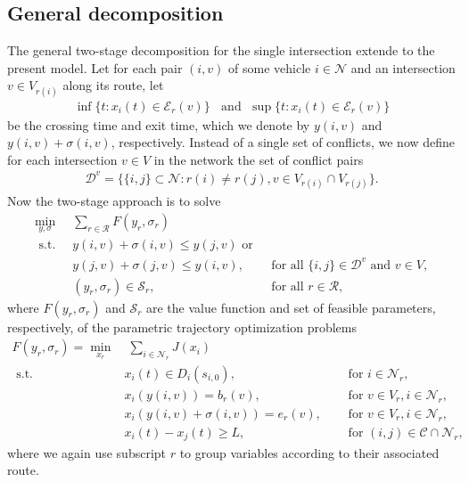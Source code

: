 \documentclass[a4paper]{article}
\theoremstyle{definition}
\theoremstyle{plain}
\begin{document}
\subsection{General decomposition}
The general two-stage decomposition for the single intersection extende to the
present model. Let for each pair $(i,v)$ of some vehicle $i \in \mathcal{N}$ and
an intersection $v \in V_{r(i)}$ along its route, let
\begin{align*}
\inf \{ t: x_{i}(t) \in \mathcal{E}_{r}(v) \} \;\; \text{ and } \; \sup \{ t: x_{i}(t) \in \mathcal{E}_{r}(v) \}
\end{align*}
be the crossing time and exit time, which we denote by $y(i,v)$ and
$y(i,v) + \sigma(i, v)$, respectively.
%
Instead of a single set of conflicts, we now define for each intersection
$v \in V$ in the network the set of conflict pairs
\begin{align*}
\mathcal{D}^{v} = \{ \{i,j\} \subset \mathcal{N} : r(i) \neq r(j), v \in V_{r(i)} \cap V_{r(j)} \} .
\end{align*}
Now the two-stage approach is to solve
\begin{align*}
  \min_{y,\sigma} \;\; & \sum_{r \in \mathcal{R}} F(y_{r}, \sigma_{r}) \\
  \text{ s.t. } & y(i,v) + \sigma(i,v) \leq y(j,v) \text{ or }  \\
                & y(j,v) + \sigma(j,v) \leq y(i,v) , & \text{ for all } \{i,j\} \in \mathcal{D}^{v} \text{ and } v \in V, \\
  & (y_{r}, \sigma_{r}) \in \mathcal{S}_{r} , \quad & \text{ for all } r \in \mathcal{R} ,
\end{align*}
%
where $F(y_{r}, \sigma_{r})$ and $\mathcal{S}_{r}$ are the value function and
set of feasible parameters, respectively, of the parametric trajectory
optimization problems
%
\begin{align*}
  F(y_{r}, \sigma_{r}) = \min_{x_{r}} & \; \sum_{i \in \mathcal{N}_{r}} J(x_{i}) \\
  \text{ s.t. } & x_{i}(t) \in D_{i}(s_{i,0}) , \quad & \text{ for } i \in \mathcal{N}_{r} , \\
  & x_{i}(y(i,v)) = b_{r}(v) , \quad & \text{ for } v \in V_{r} , i \in \mathcal{N}_{r} , \\
  & x_{i}(y(i,v) + \sigma(i,v)) = e_{r}(v) , \quad & \text{ for } v \in V_{r} , i \in \mathcal{N}_{r} , \\
  & x_{i}(t) - x_{j}(t) \geq L , \quad & \text{ for } (i, j) \in \mathcal{C} \cap \mathcal{N}_{r} ,
\end{align*}
where we again use subscript $r$ to group variables according to their associated route.
\end{document}
